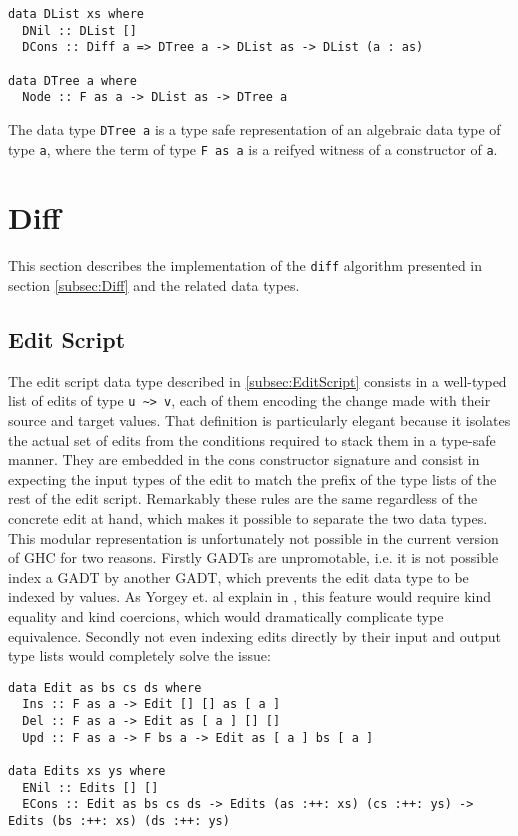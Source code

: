 \documentclass[../Thesis.tex]{subfiles}
\begin{document}
\begin{verbatim}
data DList xs where
  DNil :: DList []
  DCons :: Diff a => DTree a -> DList as -> DList (a : as)

data DTree a where
  Node :: F as a -> DList as -> DTree a
\end{verbatim}
	
	The data type \texttt{DTree a} is a type safe representation of
	an algebraic data type of type \texttt{a}, where the term
	of type \texttt{F as a} is a reifyed witness of a constructor 
	of \texttt{a}.
	
	\section{Diff}
	This section describes the implementation of the 
	\texttt{diff} algorithm presented in 	section \ref{subsec:Diff} 
	and the related data types. 
	
	\subsection{Edit Script}
	The edit script data type described in \ref{subsec:EditScript} consists in
	a well-typed list of edits of type \texttt{u \textasciitilde> v}, each of them
	encoding the change made with their source and target values.
	That definition is particularly elegant because it isolates the actual set of
	edits from the conditions required to stack them in a type-safe manner.
	They are embedded in the cons constructor signature and consist
	in expecting the input types of the edit to match the prefix of the
	type lists of the rest of the edit script.
	Remarkably these rules are the same regardless of the concrete edit 
	at hand, which makes it possible to separate the two data types.
	This modular representation is unfortunately not possible in the current
	version of GHC for two reasons. Firstly GADTs are unpromotable,  i.e. it is 
	not possible index a GADT by another GADT, which prevents the edit data 
	type	to be indexed by values.
	As Yorgey et. al explain in \cite{Yorgey12}, this feature would require kind 
	equality and kind coercions, which would  dramatically complicate type 
	equivalence.
	Secondly not even indexing edits directly by their input and output type lists
	would completely solve the issue:
	
\begin{verbatim}
data Edit as bs cs ds where
  Ins :: F as a -> Edit [] [] as [ a ] 
  Del :: F as a -> Edit as [ a ] [] [] 
  Upd :: F as a -> F bs a -> Edit as [ a ] bs [ a ] 

data Edits xs ys where
  ENil :: Edits [] [] 
  ECons :: Edit as bs cs ds -> Edits (as :++: xs) (cs :++: ys) -> Edits (bs :++: xs) (ds :++: ys) 
\end{verbatim}
	
\end{document}
